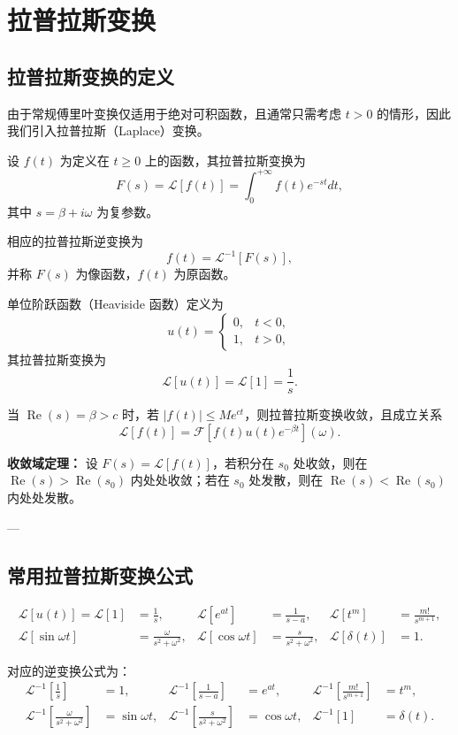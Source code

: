 
\chapter{拉普拉斯变换}

\section{拉普拉斯变换的定义}
由于常规傅里叶变换仅适用于绝对可积函数，且通常只需考虑 \( t>0 \) 的情形，因此我们引入拉普拉斯（Laplace）变换。

设 \( f(t) \) 为定义在 \( t\ge 0 \) 上的函数，其拉普拉斯变换为
\[
F(s)=\mathscr{L}[f(t)]=\int_0^{+\infty} f(t) e^{-st} dt,
\]
其中 \( s=\beta+i\omega \) 为复参数。

相应的拉普拉斯逆变换为
\[
f(t)=\mathscr{L}^{-1}[F(s)],
\]
并称 \( F(s) \) 为像函数，\( f(t) \) 为原函数。

单位阶跃函数（Heaviside 函数）定义为
\[
u(t)=
\begin{cases}
0, & t<0, \\
1, & t>0,
\end{cases}
\]
其拉普拉斯变换为
\[
\mathscr{L}[u(t)] = \mathscr{L}[1] = \frac{1}{s}.
\]

当 \( \operatorname{Re}(s)=\beta>c \) 时，若 \( |f(t)|\le Me^{ct} \)，则拉普拉斯变换收敛，且成立关系
\[
\mathscr{L}[f(t)]=\mathscr{F}\left[f(t)u(t)e^{-\beta t}\right](\omega).
\]

\textbf{收敛域定理：}
设 \( F(s)=\mathscr{L}[f(t)] \)，若积分在 \( s_0 \) 处收敛，则在 \( \operatorname{Re}(s)>\operatorname{Re}(s_0) \) 内处处收敛；若在 \( s_0 \) 处发散，则在 \( \operatorname{Re}(s)<\operatorname{Re}(s_0) \) 内处处发散。

---

\section{常用拉普拉斯变换公式}
\begin{align*}
\mathscr{L}[u(t)] = \mathscr{L}[1] &= \frac{1}{s},
& \mathscr{L}[e^{at}] &= \frac{1}{s-a},
& \mathscr{L}[t^m] &= \frac{m!}{s^{m+1}}, \\
\mathscr{L}[\sin\omega t] &= \frac{\omega}{s^2+\omega^2},
& \mathscr{L}[\cos\omega t] &= \frac{s}{s^2+\omega^2},
& \mathscr{L}[\delta(t)] &= 1.
\end{align*}

对应的逆变换公式为：
\begin{align*}
\mathscr{L}^{-1}\left[\frac{1}{s}\right] &= 1,
& \mathscr{L}^{-1}\left[\frac{1}{s-a}\right] &= e^{at},
& \mathscr{L}^{-1}\left[\frac{m!}{s^{m+1}}\right] &= t^m, \\
\mathscr{L}^{-1}\left[\frac{\omega}{s^2+\omega^2}\right] &= \sin\omega t,
& \mathscr{L}^{-1}\left[\frac{s}{s^2+\omega^2}\right] &= \cos\omega t,
& \mathscr{L}^{-1}[1] &= \delta(t).
\end{align*}

